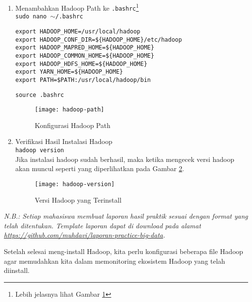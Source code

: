 \documentclass[a4paper]{tufte-handout}
\begin{document}
\begin{enumerate}
\item Menambahkan Hadoop Path ke {\tt .bashrc}\footnote{Lebih jelasnya lihat Gambar \ref{gam:hadoop-path}} \\
{\tt sudo nano $\sim$/.bashrc} \\
\begin{lstlisting}
export HADOOP_HOME=/usr/local/hadoop
export HADOOP_CONF_DIR=${HADOOP_HOME}/etc/hadoop
export HADOOP_MAPRED_HOME=${HADOOP_HOME}
export HADOOP_COMMON_HOME=${HADOOP_HOME}
export HADOOP_HDFS_HOME=${HADOOP_HOME}
export YARN_HOME=${HADOOP_HOME}
export PATH=$PATH:/usr/local/hadoop/bin
\end{lstlisting}

{\tt source .bashrc}
\begin{figure}[!ht]
\centering
\texttt{[image: hadoop-path]}
\caption{Konfigurasi Hadoop Path}
\label{gam:hadoop-path}
\end{figure}

\item Verifikasi Hasil Instalasi Hadoop \\
{\tt hadoop version} \\
Jika instalasi hadoop sudah berhasil, maka ketika mengecek versi hadoop akan muncul seperti yang diperlihatkan pada Gambar \ref{gam:hadoop-version}.
\begin{figure}[!ht]
\texttt{[image: hadoop-version]}
\caption{Versi Hadoop yang Terinstall}
\label{gam:hadoop-version}
\end{figure}
\end{enumerate}
 
\hrulefill

\clearpage
{}
\textit{N.B.: Setiap mahasiswa membuat laporan hasil praktik sesuai dengan format yang telah ditentukan. Template laporan dapat di download pada alamat \url{https://github.com/muhdavi/laporan-practice-big-data}.}


Setelah selesai meng-install Hadoop, kita perlu konfigurasi beberapa file Hadoop agar memudahkan kita dalam memonitoring ekosistem Hadoop yang telah diinstall.
\end{document}
